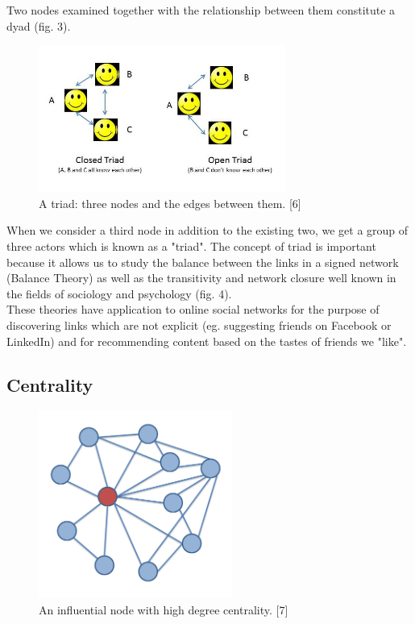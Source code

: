 \documentclass[conference,letterpaper]{IEEEtran}
\begin{document}
Two nodes examined together with the relationship between them constitute a dyad (fig. 3). \\
\begin{center}
\begin{figure}[hb]
\centering
\includegraphics[width=3.2in]{open-triad}
\caption{
A triad: three nodes and the edges between them. [6]
}
\label{fig_sim}
\end{figure}
\end{center}
When we consider a third node in addition to the existing two, we get a group of three actors which is known as a "triad". The concept of triad is important because it allows us to study the balance between the links in a signed network (Balance Theory) as well as the transitivity and network closure well known in the fields of sociology and psychology (fig. 4).\\
These theories have application to online social networks for the purpose of discovering links which are not explicit (eg. suggesting friends on Facebook or LinkedIn) and for recommending content based on the tastes of friends we "like".\\
\subsection{Centrality}

\begin{center}
\begin{figure}[hb]
\centering
\includegraphics[width=2.5in]{ego_network}
\caption{
An influential node with high degree centrality. [7]
}
\label{fig_sim}
\end{figure}
\end{center}
\end{document}
